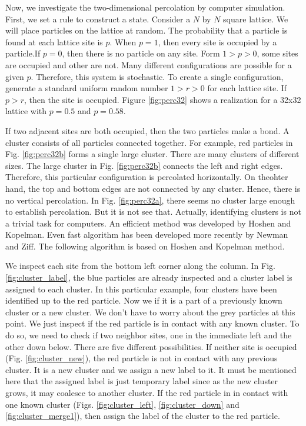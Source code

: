 Now, we investigate the two-dimensional percolation by computer simulation. First, we set a rule to construct a state. Consider a $N$ by $N$ square lattice. We will place particles on the lattice at random.  The probability that a particle is found at each lattice site is $p$.   When $p=1$, then every site is occupied by a particle.If $p=0$, then there is no particle on any site.  Form $1>p>0$, some sites are occupied and other are not.  Many different configurations are possible for a given $p$.  Therefore, this system is stochastic.  To create a single configuration, generate a standard uniform random number $1>r>0$ for each lattice site.  If $p>r$, then the site is occupied.  Figure \ref{fig:perc32} shows a realization for a 32x32 lattice with $p=0.5$ and $p=0.58$.

If two adjacent sites are both occupied, then the two particles make a bond. A cluster consists of all particles connected together. 
For example,  red particles in Fig. \ref{fig:perc32b} forms a single large cluster.  There are many clusters of different sizes. The large cluster in Fig. \ref{fig:perc32b} connects the left and right edges. Therefore, this particular configuration is percolated horizontally. On theohter hand, the top and bottom edges are not connected by any cluster.  Hence, there is no vertical percolation.  In Fig. \ref{fig:perc32a}, there seems no cluster large enough to establish percolation. But it is not see that.  Actually, identifying clusters is not a trivial task for computers.  An efficient method was developed by Hoshen and Kopelman\cite{hoshen1976}.  Even fast algorithm has been developed more recently by Newman and Ziff\cite{newman2001}.  The following algorithm is based on Hoshen and Kopelman method.

We inspect each site from the bottom left corner along the column.  In Fig. \ref{fig:cluster_label}, the blue particles are already inspected and a cluster label is assigned to each cluster.  In this particular example, four clusters have been identified up to the red particle.  Now we if it is a part of a previously known cluster or a new cluster.  We don't have to worry about the grey particles at this point.  We just inspect if the red particle is in contact with any known cluster.  To do so, we need to check if two neighbor sites, one in the immediate left and the other down below.  There are five different possibilities. If neither site is occupied (Fig. \ref{fig:cluster_new}), the red particle is not in contact with any previous cluster.  It is a new cluster and we assign a new label to it.  It must be mentioned here that the assigned label is just temporary label since as the new cluster grows, it may coalesce to another cluster.  If the red particle in in contact with one known cluster (Figs. \ref{fig:cluster_left}, \ref{fig:cluster_down} and 
\ref{fig:cluster_merge1}), then assign the label of the cluster to the red particle.  


